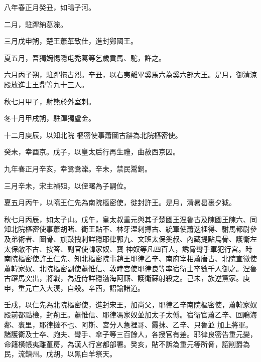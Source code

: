 
\begin{pinyinscope}

 八年春正月癸丑，如鴨子河。



 二月，駐蹕納葛濼。



 三月戊申朔，楚王蕭革致仕，進封鄭國王。



 夏五月，吾獨婉惕隱屯禿葛等乞歲貢馬、駝，許之。



 六月丙子朔，駐蹕拖古烈。辛丑，以右夷離畢奚馬六為奚六部大王。是月，御清涼殿放進士王鼎等九十三人。



 秋七月甲子，射熊於外室刺。



 冬十月甲戌朔，駐蹕獨盧金。



 十二月庚辰，以知北院
 樞密使事蕭圖古辭為北院樞密使。



 癸未，幸酉京。戊子，以皇太后行再生禮，曲赦西京囚。



 九年春正月辛亥，幸鴛鴦濼。辛未，禁民鬻銅。



 三月辛未，宋主禎殂，以侄曙為子嗣位。



 夏五月丙午，以隋王仁先為南院樞密使，徙封許王。是月，清暑曷裏夕狘。



 秋七月丙辰，如太子山。戊午，皇太叔重元與其子楚國王涅魯古及陳國王陳六、同知北院樞密使事蕭胡睹、衛王貼不、林牙涅刺搏古、統軍使蕭迭裡得、駙馬都尉參及弟術者、圖骨、旗鼓拽刺詳穩耶律郭九、文班太保奚叔、內藏提點烏骨、護衛左太保敵不古、按答、副官使韓家奴、寶
 神奴等凡四百人，誘脅彎手軍犯行宮。時南院樞密使許王仁先、知北樞密院事趙王耶律乙辛、南府宰相蕭唐古、北院宣徽使蕭韓家奴、北院樞密副使蕭惟信、敦睦宮使耶律良等率宿衛士卒數千人御之。涅魯古躍馬突出，將戰，為近侍詳穩渤海阿廝、護衛蘇射殺之。己未，族逆黨家。庚申，重元亡入大漠，自殺。辛酉，詔諭諸道。



 壬戌，以仁先為北院樞密使，進封宋王，加尚父，耶律乙辛南院樞密使，蕭韓家奴殿前都點檢，封荊王。蕭惟信、耶律馮家奴並加太子太傅。宿衛官蕭乙辛、回鵑海鄰、褭里，耶律撻不也、阿斯、宮分人急裡哥、霞抹、乙辛、只魯並
 加上將軍。諸護衛及士卒、皰夫、彎手、傘子等三百餘人，各授官有差。耶律良密告重元變，命籍橫帳夷離堇房，為漢人行宮都部署。癸亥，貼不訴為重元等所脅，詔削爵為民，流鎮州。戊胡，以黑白羊祭天。




\end{pinyinscope}
